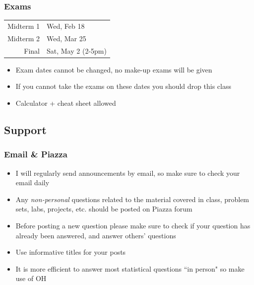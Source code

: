\documentclass[11pt,containsverbatim,handout,xcolor=xelatex,dvipsnames,table]{beamer}
\begin{document}
\begin{frame}
\frametitle{Exams}

\begin{center}
\renewcommand\arraystretch{1.25}
{\footnotesize
\begin{tabular}{ r | l }
Midterm 1								& Wed, Feb 18 \\    
Midterm 2 							& Wed, Mar 25 \\    
Final 								& Sat, May 2 (2-5pm)     
\end{tabular}
}
\end{center}

\begin{itemize}

\item Exam dates cannot be changed, no make-up exams will be given

\item If you cannot take the exams on these dates you should drop this class

\item Calculator + cheat sheet allowed

\end{itemize}

\end{frame}


\subsection{Support}


\begin{frame}
\frametitle{Email \& Piazza}

\begin{itemize}

\item I will regularly send announcements by email, so make sure to check your email  daily

\item Any \emph{non-personal} questions related to the material covered in class, problem sets, labs, projects, etc. should be posted on Piazza forum

\item Before posting a new question please make sure to check if your question has already been answered, and answer others' questions

\item Use informative titles for your posts

\item It is more efficient to answer most statistical questions ``in person" so make use of OH

\end{itemize}

\end{frame}
\end{document}
